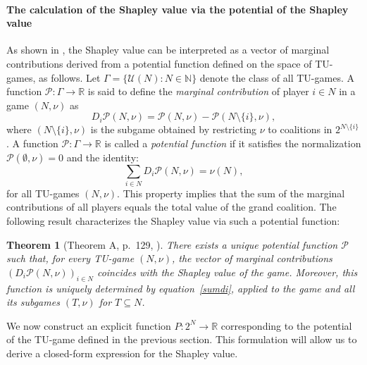 \documentclass[preprint,11pt,authoryear]{elsarticle}
\theoremstyle{plain}
\newtheorem{theorem}{Theorem}[]
\begin{document}
\paragraph{The calculation of the Shapley value via the potential of the Shapley value}
As shown in \citep{hart1988potential}, the Shapley value can be interpreted as a vector of marginal contributions derived from a potential function defined on the space of TU-games, as follows.
Let \( \Gamma = \{ \mathcal{U}(N) : N \in \mathbb{N} \} \) denote the class of all TU-games. A function \( \mathcal{P} : \Gamma \to \mathbb{R} \) is said to define the \emph{marginal contribution} of player \( i \in N \) in a game \( (N, \nu) \) as
\[
D_i \mathcal{P}(N, \nu) = \mathcal{P}(N, \nu) - \mathcal{P}(N \setminus \{i\}, \nu),
\]
where \( (N \setminus \{i\}, \nu) \) is the subgame obtained by restricting \( \nu \) to coalitions in \( 2^{N \setminus \{i\}} \).
A function \( \mathcal{P} : \Gamma \to \mathbb{R} \) is called a \emph{potential function} if it satisfies the normalization \( \mathcal{P}(\emptyset, \nu) = 0 \) and the identity:
\begin{equation} \label{sumdi}
\sum_{i \in N} D_i \mathcal{P}(N, \nu) = \nu(N),
\end{equation}
for all TU-games \( (N, \nu) \). This property implies that the sum of the marginal contributions of all players equals the total value of the grand coalition.
The following result characterizes the Shapley value via such a potential function:
\begin{theorem}[Theorem A, p.~129, \citep{hart1988potential}]
\label{mainre}
There exists a unique potential function \( \mathcal{P} \) such that, for every TU-game \( (N, \nu) \), the vector of marginal contributions \( \left( D_i \mathcal{P}(N, \nu) \right)_{i \in N} \) coincides with the Shapley value of the game. Moreover, this function is uniquely determined by equation~\eqref{sumdi}, applied to the game and all its subgames \( (T, \nu) \) for \( T \subseteq N \).
\end{theorem}
We now construct an explicit function \( P : 2^N \to \mathbb{R} \) corresponding to the potential of the TU-game defined in the previous section. This formulation will allow us to derive a closed-form expression for the Shapley value.
\end{document}
